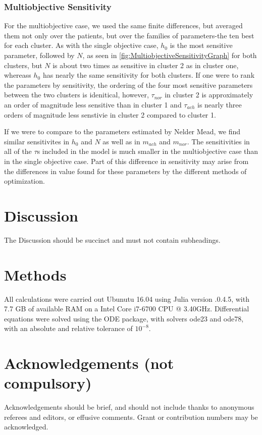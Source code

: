 \documentclass[fleqn,10pt]{wlscirep}
\begin{document}
\subsubsection*{Multiobjective Sensitivity} 
For the multiobjective case, we used the same finite differences, but averaged them not only over the patients, but over the families of parameters-the ten best for each cluster. As with the single objective case, $h_0$ is the most sensitive parameter, followed by $N$, as seen in \ref{fig:MultiobjectiveSensitivityGraph} for both clusters, but $N$ is about two times as sensitive in cluster 2 as in cluster one, whereass $h_0$ has nearly the same sensitivity for both clusters. If one were to rank the parameters by sensitivity, the ordering of the four most sensitive parameters between the two clusters is idenitical, however, $\tau_{nor}$ in cluster 2 is approximately an order of magnitude less sensitive than in cluster 1 and $\tau_{ach}$ is nearly three orders of magnitude less senstivie in cluster 2 compared to cluster 1.

If we were to compare to the parameters estimated by Nelder Mead, we find similar sensitivites in $h_0$ and $N$ as well as in $m_{ach}$ and $m_{nor}$. The sensitivities in all of the $\tau$s included in the model is much smaller in the multiobjective case than in the single objective case. Part of this difference in sensitivity may arise from the differences in value found for these parameters by the different methods of optimization.
\section*{Discussion}
The Discussion should be succinct and must not contain subheadings.
\section*{Methods}
All calculations were carried out Ubunutu 16.04 using Julia version .0.4.5, with 7.7 GB of available RAM on a Intel Core i7-6700 CPU @ 3.40GHz. Differential equations were solved using the ODE package, with solvers ode23 and ode78, with an absolute and relative tolerance of $10^{-8}$. 

\section*{Acknowledgements (not compulsory)}
Acknowledgements should be brief, and should not include thanks to anonymous referees and editors, or effusive comments. Grant or contribution numbers may be acknowledged.
\end{document}
